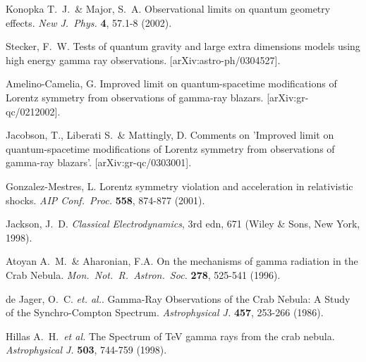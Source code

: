 \documentclass[12pt]{article}
\begin{document}
\begin{thebibliography}{99}
Konopka T.~J.~\& Major, S.~A. Observational limits on quantum
geometry effects. {\em New J.\ Phys.} {\bf 4}, 57.1-8 (2002).

Stecker, F.~W. Tests of quantum gravity and large extra
dimensions models using high  energy gamma ray observations.
[arXiv:astro-ph/0304527].

 Amelino-Camelia, G. Improved
limit on quantum-spacetime modifications of Lorentz symmetry from
observations of gamma-ray blazars. [arXiv:gr-qc/0212002].

Jacobson, T., Liberati S.~\& Mattingly, D. Comments on 'Improved
limit on quantum-spacetime modifications of  Lorentz symmetry from
observations of gamma-ray blazars'. [arXiv:gr-qc/0303001].

Gonzalez-Mestres, L.
Lorentz symmetry violation and acceleration in relativistic shocks.
{\em AIP Conf.\ Proc.} {\bf 558}, 874-877 (2001).

Jackson, J.~D. {\it Classical Electrodynamics}, 3rd edn,
671 (Wiley \& Sons, New York, 1998). 

Atoyan A.~M.~\& Aharonian, F.A.
On the mechanisms of gamma radiation in the Crab Nebula.
{\em Mon.~Not.~R.~Astron.~Soc.} {\bf 278}, 525-541 (1996).

de Jager, O.~C. {\em et. al.}.
Gamma-Ray Observations of the Crab Nebula: A Study of the Synchro-Compton
Spectrum. {\em Astrophysical J.} {\bf 457}, 253-266 (1986).

Hillas A.~H.~{\em et al.} The Spectrum of TeV gamma rays from the
crab nebula. {\em Astrophysical J.} {\bf 503}, 744-759 (1998).


\end{thebibliography}
\end{document}
